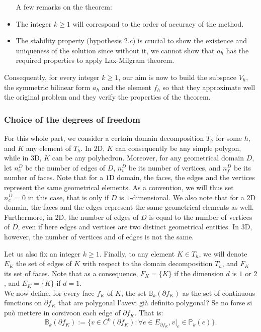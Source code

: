 \begin{remark}
\begin{itemize} A few remarks on the theorem:
\item The integer $k\geq 1$ will correspond to the order of accuracy of the method.
\item The stability property (hypothesis $2.c$) is crucial to show the existence and uniqueness of the solution since without it, we cannot show that $a_h$ has the required properties to apply Lax-Milgram theorem.
\end{itemize}
\end{remark}

Consequently, for every integer $k\geq 1$, our aim is now to build the subspace $V_h$, the symmetric bilinear form $a_h$ and the element $f_h$ so that they approximate well the original problem and they verify the properties of the theorem.

\subsubsection{Choice of the degrees of freedom}

For this whole part, we consider a certain domain decomposition $T_h$ for some $h$, and $K$ any element of $T_h$. In $2$D, $K$ can consequently be any simple polygon, while in $3$D, $K$ can be any polyhedron. Moreover, for any geometrical domain $D$, let $n_e^D$ be the number of edges of $D$, $n_v^D$ be its number of vertices, and $n_f^D$ be its number of faces. Note that for a $1$D domain, the faces, the edges and the vertices represent the same geometrical elements. As a convention, we will thus set $n_e^D = 0$ in this case, that is only if $D$ is $1$-dimensional. We also note that for a $2$D domain, the faces and the edges represent the same geometrical elements as well. Furthermore, in $2$D, the number of edges of $D$ is equal to the number of vertices of $D$, even if here edges and vertices are two distinct geometrical entities. In $3$D, however, the number of vertices and of edges is not the same.

Let us also fix an integer $k\geq 1$. Finally, {\color{red}to} any element $K\in T_h$, we will denote $E_K$ the set of edges of $K$ with respect to the domain decomposition $T_h$, and $F_K$ its set of faces. Note that as a consequence, $F_K=\{K\}$ if the dimension $d$ is $1$ or $2$, and $E_K=\{K\}$ if $d=1$. \\

We now define, for every face $f_K$ of $K$, the set $\mathbb{B}_k(\partial f_K)$ as the set of continuous functions on $\partial f_K$ that are polygonal {\color{red} l'avevi già definito polygonal? Se no forse si può mettere in corsivo}on each edge of $\partial f_K$. That is: 
$$ \mathbb{B}_k(\partial f_K) := \Big\{v\in C^0(\partial f_K): \forall e\in E_{\partial f_K}, v|_e \in \mathbb{P}_k(e)\Big\}.$$

